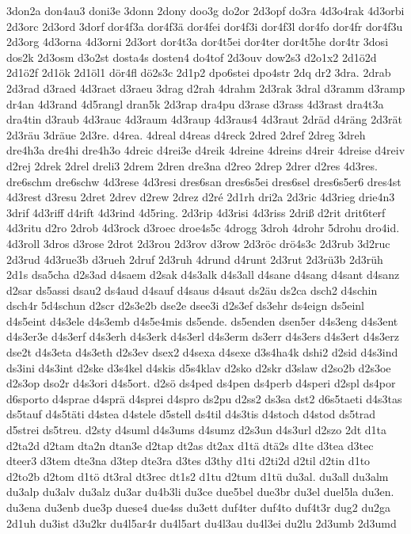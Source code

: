 {3don2a
don4au3
doni3e
3donn
2dony
doo3g
do2or
2d3opf
do3ra
4d3o4rak
4d3orbi
2d3orc
2d3ord
3dorf
dor4f3a
dor4f3ä
dor4fei
dor4f3i
dor4f3l
dor4fo
dor4fr
dor4f3u
2d3org
4d3orna
4d3orni
2d3ort
dor4t3a
dor4t5ei
dor4ter
dor4t5he
dor4tr
3dosi
dos2k
2d3osm
d3o2st
dosta4s
dosten4
do4tof
2d3ouv
dow2s3
d2o1x2
2d1ö2d
2d1ö2f
2d1ök
2d1öl1
dör4fl
dö2s3c
2d1p2
dpo6stei
dpo4str
2dq
dr2
3dra.
2drab
2d3rad
d3raed
4d3raet
d3raeu
3drag
d2rah
4drahm
2d3rak
3dral
d3ramm
d3ramp
dr4an
4d3rand
4d5rangl
dran5k
2d3rap
dra4pu
d3rase
d3rass
4d3rast
dra4t3a
dra4tin
d3raub
4d3rauc
4d3raum
4d3raup
4d3raus4
4d3raut
2dräd
d4räng
2d3rät
2d3räu
3dräue
2d3re.
d4rea.
4dreal
d4reas
d4reck
2dred
2dref
2dreg
3dreh
dre4h3a
dre4hi
dre4h3o
4dreic
d4rei3e
d4reik
4dreine
4dreins
d4reir
4dreise
d4reiv
d2rej
2drek
2drel
dreli3
2drem
2dren
dre3na
d2reo
2drep
2drer
d2res
4d3res.
dre6schm
dre6schw
4d3rese
4d3resi
dres6san
dres6s5ei
dres6sel
dres6s5er6
dres4st
4d3rest
d3resu
2dret
2drev
d2rew
2drez
d2ré
2d1rh
dri2a
2d3ric
4d3rieg
drie4n3
3drif
4d3riff
d4rift
4d3rind
4d5ring.
2d3rip
4d3risi
4d3riss
2driß
d2rit
drit6terf
4d3ritu
d2ro
2drob
4d3rock
d3roec
droe4s5c
4drogg
3droh
4drohr
5drohu
dro4id.
4d3roll
3dros
d3rose
2drot
2d3rou
2d3rov
d3row
2d3röc
drö4s3c
2d3rub
3d2ruc
2d3rud
4d3rue3b
d3rueh
2druf
2d3ruh
4drund
d4runt
2d3rut
2d3rü3b
2d3rüh
2d1s
dsa5cha
d2s3ad
d4saem
d2sak
d4s3alk
d4s3all
d4sane
d4sang
d4sant
d4sanz
d2sar
ds5assi
dsau2
ds4aud
d4sauf
d4saus
d4saut
ds2äu
ds2ca
dsch2
d4schin
dsch4r
5d4schun
d2scr
d2s3e2b
dse2e
dsee3i
d2s3ef
ds3ehr
ds4eign
ds5einl
d4s5eint
d4s3ele
d4s3emb
d4s5e4mis
ds5ende.
ds5enden
dsen5er
d4s3eng
d4s3ent
d4s3er3e
d4s3erf
d4s3erh
d4s3erk
d4s3erl
d4s3erm
ds3err
d4s3ers
d4s3ert
d4s3erz
dse2t
d4s3eta
d4s3eth
d2s3ev
dsex2
d4sexa
d4sexe
d3s4ha4k
dshi2
d2sid
d4s3ind
ds3ini
d4s3int
d2ske
d3s4kel
d4skis
d5s4klav
d2sko
d2skr
d3slaw
d2so2b
d2s3oe
d2s3op
dso2r
d4s3ori
d4s5ort.
d2sö
ds4ped
ds4pen
ds4perb
d4speri
d2spl
ds4por
d6sporto
d4sprae
d4sprä
d4sprei
d4spro
ds2pu
d2ss2
ds3sa
dst2
d6s5taeti
d4s3tas
ds5tauf
d4s5täti
d4stea
d4stele
d5stell
ds4til
d4s3tis
d4stoch
d4stod
ds5trad
d5strei
ds5treu.
d2sty
d4suml
d4s3ums
d4sumz
d2s3un
d4s3url
d2szo
2dt
d1ta
d2ta2d
d2tam
dta2n
dtan3e
d2tap
dt2as
dt2ax
d1tä
dtä2s
d1te
d3tea
d3tec
dteer3
d3tem
dte3na
d3tep
dte3ra
d3tes
d3thy
d1ti
d2ti2d
d2til
d2tin
d1to
d2to2b
d2tom
d1tö
dt3ral
dt3rec
dt1s2
d1tu
d2tum
d1tü
du3al.
du3all
du3alm
du3alp
du3alv
du3alz
du3ar
du4b3li
du3ce
due5bel
due3br
du3el
duel5la
du3en.
du3ena
du3enb
due3p
duese4
due4ss
du3ett
duf4ter
duf4to
duf4t3r
dug2
du2ga
2d1uh
du3ist
d3u2kr
du4l5ar4r
du4l5art
du4l3au
du4l3ei
du2lu
2d3umb
2d3umd
}
